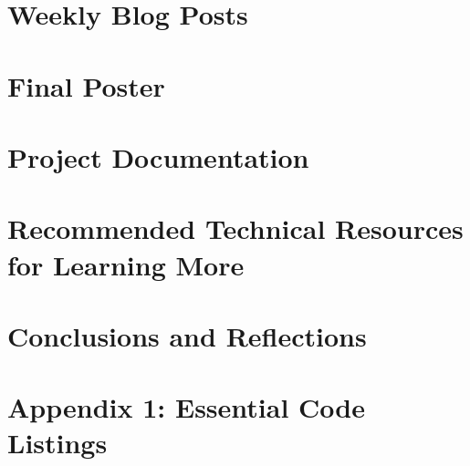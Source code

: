 \documentclass[letterpaper,10pt,serif,draftclsnofoot,onecolumn,compsoc,titlepage]{IEEEtran}
\begin{document}
\newpage

\section{Weekly Blog Posts}


\newpage

\section{Final Poster}


\newpage

\section{Project Documentation}


\newpage

\section{Recommended Technical Resources for Learning More}


\newpage

\section{Conclusions and Reflections}


\newpage

\section{Appendix 1: Essential Code Listings}


\nocite{*}
\end{document}

